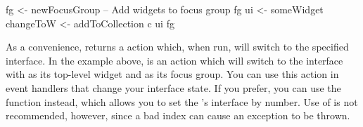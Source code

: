 \begin{haskellcode}
 fg <- newFocusGroup
 -- Add widgets to focus group fg
 ui <- someWidget
 changeToW <- addToCollection c ui fg
\end{haskellcode}

As a convenience,  returns a  action
which, when run, will switch to the specified interface.  In the
example above,  is an action which will switch to the
interface with  as its top-level widget and  as its
focus group.  You can use this action in event handlers that change
your interface state.  If you prefer, you can use the
 function instead, which allows you to set the
's interface by number.  Use of  is
not recommended, however, since a bad index can cause an exception to
be thrown.
